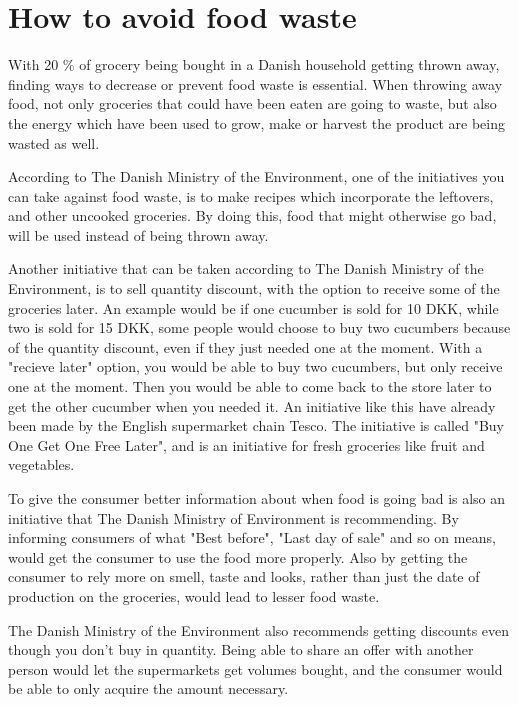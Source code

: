 \section{How to avoid food waste}
With 20 \% of grocery being bought in a Danish household getting thrown away, finding ways to decrease or prevent food waste is essential. When throwing away food, not only groceries that could have been eaten are going to waste, but also the energy which have been used to grow, make or harvest the product are being wasted as well.

According to The Danish Ministry of the Environment, one of the initiatives you can take against food waste, is to make recipes which incorporate the leftovers, and other uncooked groceries. By doing this, food that might otherwise go bad, will be used instead of being thrown away. %

Another initiative that can be taken according to The Danish Ministry of the Environment, is to sell quantity discount, with the option to receive some of the groceries later. An example would be if one cucumber is sold for 10 DKK, while two is sold for 15 DKK, some people would choose to buy two cucumbers because of the quantity discount, even if they just needed one at the moment. With a "recieve later" option, you would be able to buy two cucumbers, but only receive one at the moment. Then you would be able to come back to the store later to get the other cucumber when you needed it. An initiative like this have already been made by the English supermarket chain Tesco. The initiative is called "Buy One Get One Free Later", and is an initiative for fresh groceries like fruit and vegetables.

To give the consumer better information about when food is going bad is also an initiative that The Danish Ministry of Environment is recommending. By informing consumers of what "Best before", "Last day of sale" and so on means, would get the consumer to use the food more properly. Also by getting the consumer to rely more on smell, taste and looks, rather than just the date of production on the groceries, would lead to lesser food waste.

The Danish Ministry of the Environment also recommends getting discounts even though you don't buy in quantity. Being able to share an offer with another person would let the supermarkets get volumes bought, and the consumer would be able to only acquire the amount necessary.


